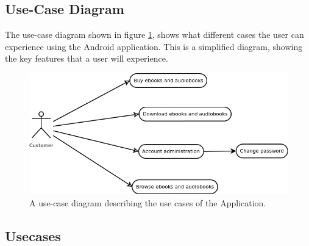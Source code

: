 \documentclass[12pt]{article}
\begin{document}
\subsection{Use-Case Diagram}

The use-case diagram shown in figure \ref{casemodel}, shows what different cases the user can experience using the Android application. This is a simplified diagram, showing the key features that a user will experience.
\begin{figure}[H]
\center
\includegraphics[scale=0.7]{Casemodel.png}
\caption{A use-case diagram describing the use cases of the Application.}
\label{casemodel}
\end{figure}

\subsection{Usecases}
\end{document}

